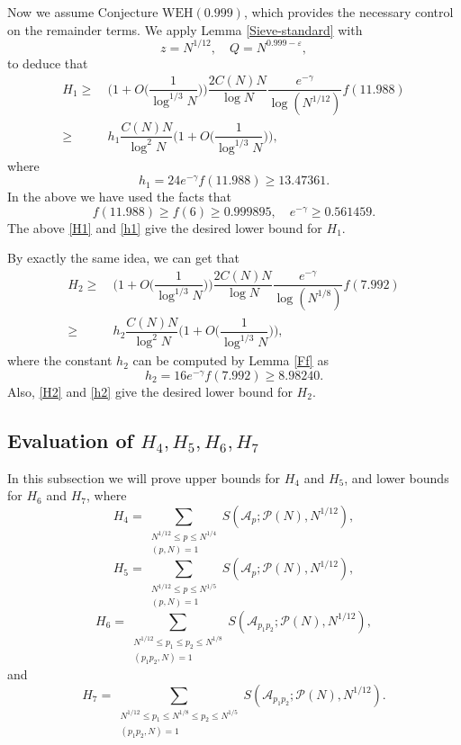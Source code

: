\documentclass[12pt, a4paper]{amsart}
\def\leq{\leqslant}
\def\le{\leqslant}
\def\ge{\geqslant}
\theoremstyle{plain}
\theoremstyle{remark}
\numberwithin{equation}{section}
\begin{document}
Now we assume Conjecture $\mathrm{WEH}(0.999)$, which provides the necessary control on the remainder terms.
We apply Lemma \ref{Sieve-standard} with
\[
z=N^{1/12},\quad Q=N^{0.999-\varepsilon},
\]
to deduce that
\begin{equation}\label{H1}
\begin{aligned}
H_1\ge\ & \bigg(1+O\bigg(\dfrac{1}{\log^{1/3}N}\bigg)\bigg)\dfrac{2C(N)N}{\log N}\dfrac{e^{-\gamma}}{\log (N^{1/12})}f(11.988)\\
\ge\ & h_1\dfrac{C(N)N}{\log^2 N} \bigg(1+O\bigg(\dfrac{1}{\log^{1/3}N}\bigg)\bigg),
\end{aligned}
\end{equation}
where
\begin{equation}\label{h1}
h_1=24e^{-\gamma}f(11.988)\ge 13.47361. 
\end{equation}
In the above we have used the facts that
\begin{equation}\label{f6,E-gamma}
f(11.988)\ge f(6)\ge 0.999895, \quad e^{-\gamma}\ge 0.561459.
\end{equation}
The above \eqref{H1} and \eqref{h1} give the desired lower bound for $H_1$.

By exactly the same idea, we can get that
\begin{equation}\label{H2}
\begin{aligned}
H_2\ge\ & \bigg(1+O\bigg(\dfrac{1}{\log^{1/3}N}\bigg)\bigg)\dfrac{2C(N)N}{\log N}\dfrac{e^{-\gamma}}{\log (N^{1/8})}f(7.992)\\
\ge\ & h_2\dfrac{C(N)N}{\log^2 N} \bigg(1+O\bigg(\dfrac{1}{\log^{1/3}N}\bigg)\bigg),
\end{aligned}
\end{equation}
where the constant $h_2$ can be computed by Lemma \ref{Ff} as 
\begin{equation}\label{h2}
h_2=16e^{-\gamma}f(7.992)\ge 8.98240.
\end{equation}
Also, \eqref{H2} and \eqref{h2} give the desired lower bound for $H_2$.

\subsection{Evaluation of $H_4,H_5,H_6,H_7$}
In this subsection we will prove upper bounds for $H_4$ and $H_5$, and lower bounds for $H_6$ and $H_7$, where
\[
H_4 = \sum_{\substack{N^{1/12} \leq p \le N^{1/4} \\ (p, N) = 1}} S(\mathscr{A}_p; \mathscr{P}(N), N^{1/12}),
\]
\[
H_5 = \sum_{\substack{N^{1/12} \leq p \le N^{1/5} \\ (p, N) = 1}} S(\mathscr{A}_p; \mathscr{P}(N), N^{1/12}),
\]
\[
H_6 = \sum_{\substack{N^{1/12} \leq p_1 \le p_2 \le N^{1/8} \\ (p_1 p_2, N) = 1}} S(\mathscr{A}_{p_1 p_2}; \mathscr{P}(N), N^{1/12}),
\]
and 
\[
H_7 = \sum_{\substack{N^{1/12} \leq p_1 \le N^{1/8} \le p_2 \le N^{1/5} \\ (p_1 p_2, N) = 1}} S(\mathscr{A}_{p_1 p_2}; \mathscr{P}(N), N^{1/12}).
\]
\end{document}
